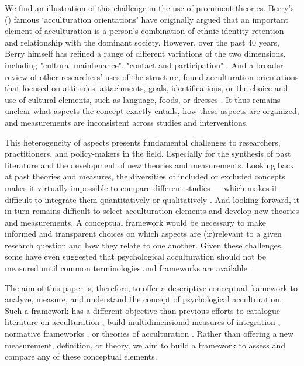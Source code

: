 \documentclass[man, 12pt, a4paper]{apa7}
\begin{document}
We find an illustration of this challenge in the use of prominent theories. Berry's (\citeyear{Berry1980, Berry1997b, Berry2005}) famous `acculturation orientations' have originally argued that an important element of acculturation is a person's combination of ethnic identity retention and relationship with the dominant society. However, over the past 40 years, Berry himself has refined a range of different variations of the two dimensions, including "cultural maintenance", "contact and participation" \citep[p. 9]{Berry1997b}. And a broader review of other researchers' uses of the structure, found acculturation orientations that focused on attitudes, attachments, goals, identifications, or the choice and use of cultural elements, such as language, foods, or dresses \citep[e.g.,][]{Rudmin2003a}. It thus remains unclear what aspects the concept exactly entails, how these aspects are organized, and measurements are inconsistent across studies and interventions.

This heterogeneity of aspects presents fundamental challenges to researchers, practitioners, and policy-makers in the field. Especially for the synthesis of past literature and the development of new theories and measurements.
Looking back at past theories and measures, the diversities of included or excluded concepts makes it virtually impossible to compare different studies --- which makes it difficult to integrate them quantitatively or qualitatively \citep{Taft1981}.
And looking forward, it in turn remains difficult to select acculturation elements and develop new theories and measurements. A conceptual framework would be necessary to make informed and transparent choices on which aspects are (ir)relevant to a given research question and how they relate to one another.
Given these challenges, some have even suggested that psychological acculturation should not be measured until common terminologies and frameworks are available \citep{Escobar2000}.

The aim of this paper is, therefore, to offer a descriptive conceptual framework to analyze, measure, and understand the concept of psychological acculturation. Such a framework has a different objective than previous efforts to catalogue literature on acculturation \citep[e.g.,][]{Castels2003}, build multidimensional measures of integration \citep[e.g.,][]{Harder2018}, normative frameworks \citep[e.g.,][]{Ager2008a}, or theories of acculturation \citep[e.g.,][]{Berry2005}. Rather than offering a new measurement, definition, or theory, we aim to build a framework to assess and compare any of these conceptual elements. 
\end{document}

